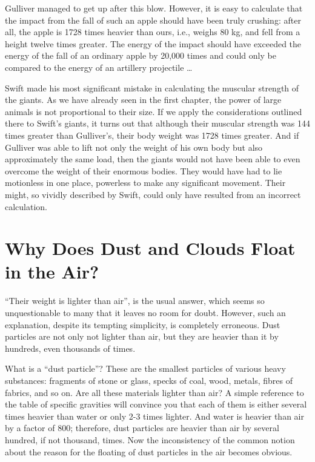 Gulliver managed to get up after this blow. However, it is easy to calculate that the impact from the fall of such an apple should have been truly crushing: after all, the apple is 1728 times heavier than ours, i.e., weighs 80 kg, and fell from a height twelve times greater. The energy of the impact should have exceeded the energy of the fall of an ordinary apple by 20,000 times and could only be compared to the energy of an artillery projectile \dots{}

Swift made his most significant mistake in calculating the muscular strength of the giants. As we have already seen in the first chapter, the power of large animals is not proportional to their size. If we apply the considerations outlined there to Swift's giants, it turns out that although their muscular strength was 144 times greater than Gulliver's, their body weight was 1728 times greater. And if Gulliver was able to lift not only the weight of his own body but also approximately the same load, then the giants would not have been able to even overcome the weight of their enormous bodies. They would have had to lie motionless in one place, powerless to make any significant movement. Their might, so vividly described by Swift, could only have resulted from an incorrect calculation.

\section{Why Does Dust and Clouds Float in the Air?}
\label{sec-11.15}

``Their weight is lighter than air'', is the usual answer, which seems so unquestionable to many that it leaves no room for doubt. However, such an explanation, despite its tempting simplicity, is completely erroneous. Dust particles are not only not lighter than air, but they are heavier than it by hundreds, even thousands of times.

What is a ``dust particle''? These are the smallest particles of various heavy substances: fragments of stone or glass, specks of coal, wood, metals, fibres of fabrics, and so on. Are all these materials lighter than air? A simple reference to the table of specific gravities will convince you that each of them is either several times heavier than water or only 2-3 times lighter. And water is heavier than air by a factor of 800; therefore, dust particles are heavier than air by several hundred, if not thousand, times. Now the inconsistency of the common notion about the reason for the floating of dust particles in the air becomes obvious.

